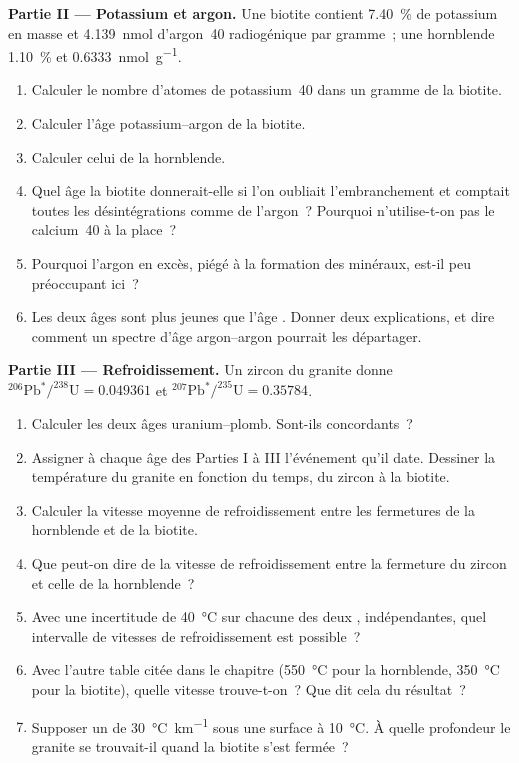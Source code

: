 \begin{problem}
\noindent\textbf{Partie II --- Potassium et argon.} Une biotite contient
\qty{7.40}{\percent} de potassium en masse et \qty{4.139}{nmol} d'argon~40
radiogénique par gramme~; une hornblende \qty{1.10}{\percent} et \qty{0.6333}{nmol.g^{-1}}.
\begin{enumerate}[resume]
  \item Calculer le nombre d'atomes de potassium~40 dans un gramme de la biotite.
  \item Calculer l'âge potassium--argon de la biotite.
  \item Calculer celui de la hornblende.
  \item Quel âge la biotite donnerait-elle si l'on oubliait l'embranchement et comptait toutes les
        désintégrations comme de l'argon~? Pourquoi n'utilise-t-on pas le calcium~40 à la place~?
  \item Pourquoi l'argon en excès, piégé à la formation des minéraux, est-il peu
        préoccupant ici~?
  \item Les deux âges sont plus jeunes que l'âge . Donner deux explications, et
        dire comment un spectre d'âge argon--argon pourrait les départager.
\end{enumerate}

\noindent\textbf{Partie III --- Refroidissement.} Un zircon du granite donne
$^{206}\mathrm{Pb}^*/^{238}\mathrm{U} = 0.049361$ et
$^{207}\mathrm{Pb}^*/^{235}\mathrm{U} = 0.35784$.
\begin{enumerate}[resume]
  \item Calculer les deux âges uranium--plomb. Sont-ils concordants~?
  \item Assigner à chaque âge des Parties I à III l'événement qu'il date. Dessiner la
        température du granite en fonction du temps, du zircon à la biotite.
  \item Calculer la vitesse moyenne de refroidissement entre les fermetures de la hornblende et de la
        biotite.
  \item Que peut-on dire de la vitesse de refroidissement entre la fermeture du zircon
        et celle de la hornblende~?
  \item Avec une incertitude de \qty{40}{\celsius} sur chacune des deux , indépendantes, quel intervalle de vitesses de refroidissement est possible~?
  \item Avec l'autre table citée dans le chapitre (\qty{550}{\celsius} pour la
        hornblende, \qty{350}{\celsius} pour la biotite), quelle vitesse trouve-t-on~? Que
        dit cela du résultat~?
  \item Supposer un  de \qty{30}{\celsius.km^{-1}} sous une surface à
        \qty{10}{\celsius}. À quelle profondeur le granite se trouvait-il quand la biotite
        s'est fermée~?
\end{enumerate}


\end{problem}
